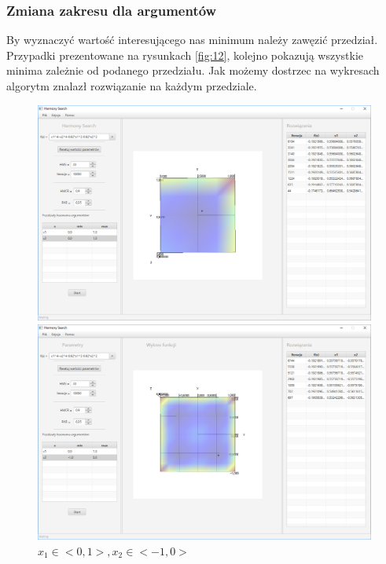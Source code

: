 \documentclass[10pt, a4paper]{article}
\begin{document}
\subsubsection{Zmiana zakresu dla argumentów}
\label{subsubsec:fcn4min2}
By wyznaczyć wartość interesującego nas minimum należy zawęzić przedział. Przypadki prezentowane na rysunkach \ref{fig:12}, kolejno pokazują wszystkie minima zależnie od podanego przedziału. Jak możemy dostrzec na wykresach algorytm znalazł rozwiązanie na każdym przedziale.
\begin{figure}[htbp] 
	\begin{minipage}[b]{.5\textwidth}
		\centering
		\includegraphics[width=\linewidth]{images/12.PNG}
		\caption{$x_{1}\in<0,1>,  x_{2}\in<0,1>$}
	\end{minipage} 
	\begin{minipage}[b]{.5\textwidth}
		\centering
		\includegraphics[width=\linewidth]{images/17.PNG} 
		\caption{$x_{1}\in<0,1>,  x_{2}\in<-1,0>$}

\end{minipage}
\end{figure}
\end{document}

